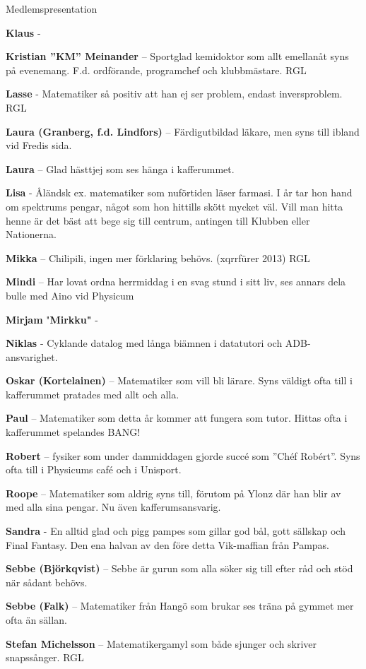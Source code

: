 \documentclass{spektraklet}
\begin{document}
\begin{artikel}{Medlemspresentation}{}
\begin{twocolumns}
\textbf{Klaus} - 

\textbf{Kristian ”KM” Meinander} – Sportglad kemidoktor som allt emellanåt syns på evenemang. F.d. ordförande, programchef och klubbmästare. RGL

\textbf{Lasse} - Matematiker så positiv att han ej ser problem, endast inversproblem. RGL

\textbf{Laura (Granberg, f.d. Lindfors)} – Färdigutbildad läkare, men syns till ibland vid Fredis sida.

\textbf{Laura} – Glad hästtjej som ses hänga i kafferummet.

\textbf{Lisa} - Åländsk ex. matematiker som nuförtiden läser farmasi. I år tar hon hand om spektrums pengar, något som hon hittills skött mycket väl. Vill man hitta henne  är det bäst att bege sig till centrum, antingen till Klubben eller Nationerna.

\textbf{Mikka} – Chilipili, ingen mer förklaring behövs. (xqrrfürer 2013) RGL

\textbf{Mindi} – Har lovat ordna herrmiddag i en svag stund i sitt liv, ses annars dela bulle med Aino vid Physicum

\textbf{Mirjam} "\textbf{Mirkku"} - 

\textbf{Niklas} - Cyklande datalog med långa biämnen i datatutori och ADB-ansvarighet.

\textbf{Oskar (Kortelainen)} – Matematiker som vill bli lärare. Syns väldigt ofta till i kafferummet pratades med allt och alla.

\textbf{Paul} – Matematiker som detta år kommer att fungera som tutor. Hittas ofta i kafferummet spelandes BANG!

\textbf{Robert} – fysiker som under dammiddagen gjorde succé som ”Chéf Robért”. Syns ofta till i Physicums café och i Unisport.

\textbf{Roope} – Matematiker som aldrig syns till, förutom på Ylonz där han blir av med alla sina pengar. Nu även kafferumsansvarig.


\textbf{Sandra} - En alltid glad och pigg pampes som gillar god bål, gott sällskap och Final Fantasy. Den ena halvan av den före detta Vik-maffian från Pampas.

\textbf{Sebbe (Björkqvist)} – Sebbe är gurun som alla söker sig till efter råd och stöd när sådant behövs.

\textbf{Sebbe (Falk)} – Matematiker från Hangö som brukar ses träna på gymmet mer ofta än sällan.

\textbf{Stefan Michelsson} – Matematikergamyl som både sjunger och skriver snapssånger. RGL


\end{twocolumns}
\end{artikel}
\end{document}
